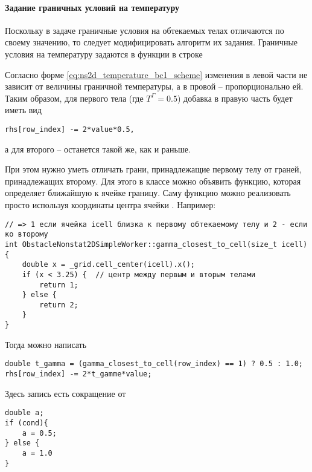 \paragraph{Задание граничных условий на температуру}
Поскольку в задаче граничные условия на обтекаемых
телах отличаются по своему значению, то следует
модифицировать алгоритм их задания.
Граничные условия на температуру задаются в функции 
в строке

Согласно форме
\cref{eq:ns2d_temperature_bc1_scheme}
изменения в левой части не зависит от величины граничной температуры,
а в провой -- пропорционально ей.
Таким образом, для первого тела (где $T^\Gamma = 0.5$) добавка в правую часть будет иметь вид
\begin{verbatim}
rhs[row_index] -= 2*value*0.5,
\end{verbatim}
а для второго -- останется такой же, как и раньше.

При этом нужно уметь отличать грани, принадлежащие
первому телу от граней, принадлежащих второму.
Для этого в классе  можно
объявить функцию, которая определяет ближайшую к ячейке границу.
Саму функцию можно реализовать просто используя координаты
центра ячейки . Например:
\begin{verbatim}
// => 1 если ячейка icell близка к первому обтекаемому телу и 2 - если ко второму
int ObstacleNonstat2DSimpleWorker::gamma_closest_to_cell(size_t icell){
	double x = _grid.cell_center(icell).x();
	if (x < 3.25) {  // центр между первым и вторым телами
		return 1;
	} else {
		return 2;
	}
}
\end{verbatim}
Тогда можно написать
\begin{verbatim}
double t_gamma = (gamma_closest_to_cell(row_index) == 1) ? 0.5 : 1.0;
rhs[row_index] -= 2*t_gamme*value;
\end{verbatim}
Здесь запись  есть сокращение от

\begin{verbatim}
double a;
if (cond){
	a = 0.5;
} else {
	a = 1.0
}
\end{verbatim}

